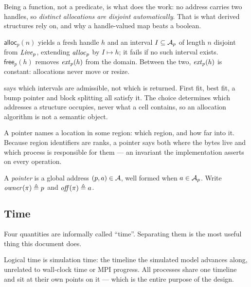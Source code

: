 Being a function, not a predicate, is what does the work: no address carries
two handles, so \emph{distinct allocations are disjoint automatically}. That
is what derived structures rely on, and why a handle-valued map beats a
boolean.

\begin{definition}\label{def:alloc-ops}
$\mathsf{alloc}_p(n)$ yields a fresh handle $h$ and an interval
$I \subseteq \mathcal{A}_{p}$ of length $n$ disjoint from $\mathit{Live}_{p}$, extending
$\mathit{alloc}_{p}$ by $I \mapsto h$; it fails if no such interval exists.
$\mathsf{free}_p(h)$ removes $\mathit{ext}_{p}(h)$ from the domain. Between the two,
$\mathit{ext}_{p}(h)$ is constant: allocations never move or resize.
\end{definition}

\begin{remark}\label{rem:alloc-policy}
 says which intervals are admissible, not which is
returned. First fit, best fit, a bump pointer and block splitting all satisfy
it. The choice determines which addresses a structure occupies, never what a
\gls{cell} contains, so an allocation algorithm is not a semantic object.
\end{remark}

A pointer names a location in some region: which region, and how far into it.
Because region identifiers are ranks, a pointer says both where the bytes live
and which process is responsible for them --- an invariant the implementation
asserts on every operation.

\begin{definition}[Pointer]\label{def:pointer}
A \emph{pointer} is a global address $(p,a) \in \mathcal{A}$, well formed
when $a \in \mathcal{A}_{p}$. Write $\mathit{owner}(\pi) \triangleq p$ and
$\mathit{off}(\pi) \triangleq a$.
\end{definition}

\subsection{Time}
\label{sec:gloss-time}

Four quantities are informally called ``time''. Separating them is the most
useful thing this document does.

Logical time is simulation time: the timeline the simulated model advances
along, unrelated to wall-clock time or MPI progress. All processes share one
timeline and sit at their own points on it --- which is the entire purpose of
the design.

